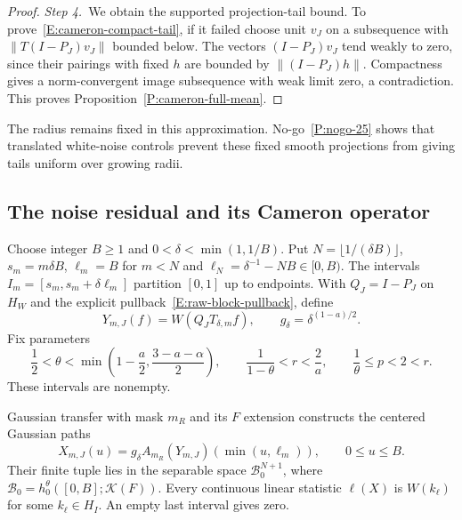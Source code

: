 \begin{proof}
  \medskip
  \noindent\textit{Step 4.~}We obtain the supported projection-tail bound.
  To prove~\eqref{E:cameron-compact-tail}, if it failed choose unit $v_J$ on a
  subsequence with $\|T(I-P_J)v_J\|$ bounded below. The vectors $(I-P_J)v_J$
  tend weakly to zero, since their pairings with fixed $h$ are bounded by
  $\|(I-P_J)h\|$. Compactness gives a norm-convergent image subsequence with
  weak limit zero, a contradiction. This proves
  Proposition~\ref{P:cameron-full-mean}.
\end{proof}

The radius remains fixed in this approximation. No-go~\ref{P:nogo-25}
shows that translated white-noise controls prevent these fixed smooth
projections from giving tails uniform over growing radii.


\subsection{The noise residual and its Cameron operator}

Choose integer $B \ge 1$ and $0 < \delta < \min(1,1/B)$. Put $N =
\lfloor1/(\delta B)\rfloor$, $s_m = m\delta B$, $\ell_m = B$ for $m < N$ and
$\ell_N = \delta^{-1}-NB \in [0,B)$. The intervals $I_m =
[s_m,s_m+\delta\ell_m]$ partition $[0,1]$ up to endpoints. With $Q_J = I-P_J$ on
$H_W$ and the explicit pullback~\eqref{E:raw-block-pullback}, define
\[
  Y_{m,J}(f)=W(Q_JT_{\delta,m}f),\qquad
  g_\delta=\delta^{(1-a)/2}.
\]
Fix parameters
\begin{equation}\label{E:cameron-block-parameters}
  \frac12<\theta<\min\left(1-\frac a2,\frac{3-a-\alpha}{2}\right),
  \qquad \frac1{1-\theta}<r<\frac2a,\qquad
  \frac1\theta\le p<2<r .
\end{equation}
These intervals are nonempty.

\begin{lemma}\label{L:cameron-actual-residual}
  Gaussian transfer with mask $m_R$ and its $F$ extension constructs the
  centered Gaussian paths
  \[
    X_{m,J}(u)=g_\delta A_{m_R}(Y_{m,J})(\min(u,\ell_m)),
    \qquad 0\le u\le B.
  \]
  Their finite tuple lies in the separable space $\mathscr{B}_0^{N+1}$, where
  $\mathscr{B}_0 = h_0^\theta([0,B];\mathcal{K}(F))$. Every continuous linear
  statistic $\ell(X)$ is $W(k_\ell)$ for some $k_\ell \in H_I$. An empty last
  interval gives zero.
\end{lemma}


